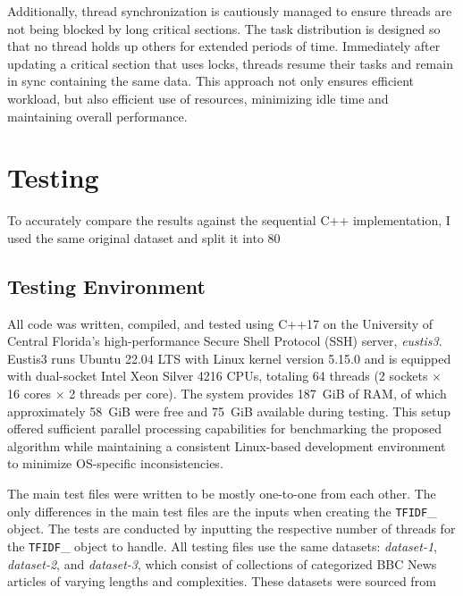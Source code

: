 \documentclass[conference]{IEEEtran}
\newcommand{\code}[1]{\lstinline[basicstyle=\ttfamily]|#1|}
\begin{document}
Additionally, thread synchronization is cautiously managed to ensure threads are not being blocked by long critical sections. The task distribution is designed so that no thread holds up others for extended periods of time. Immediately after updating a critical section that uses locks, threads resume their tasks and remain in sync containing the same data. This approach not only ensures efficient workload, but also efficient use of resources, minimizing idle time and maintaining overall performance.

\section{Testing}
To accurately compare the results against the sequential C++ implementation, I used the same original dataset and split it into 80%

\subsection{Testing Environment}
All code was written, compiled, and tested using C++17 on the University of Central Florida’s high-performance Secure Shell Protocol (SSH) server, \textit{eustis3}. Eustis3 runs Ubuntu 22.04 LTS with Linux kernel version 5.15.0 and is equipped with dual-socket Intel\textsuperscript{\textregistered} Xeon\textsuperscript{\textregistered} Silver 4216 CPUs, totaling 64 threads (2 sockets × 16 cores × 2 threads per core). The system provides 187~GiB of RAM, of which approximately 58~GiB were free and 75~GiB available during testing. This setup offered sufficient parallel processing capabilities for benchmarking the proposed algorithm while maintaining a consistent Linux-based development environment to minimize OS-specific inconsistencies.

The main test files were written to be mostly one-to-one from each other. The only differences in the main test files are the inputs when creating the \code{TFIDF}\_ object. The tests are conducted by inputting the respective number of threads for the \code{TFIDF}\_ object to handle. All testing files use the same datasets: \textit{dataset-1}, \textit{dataset-2}, and \textit{dataset-3}, which consist of collections of categorized BBC News articles of varying lengths and complexities. These datasets were sourced from \cite{b6}
\end{document}
